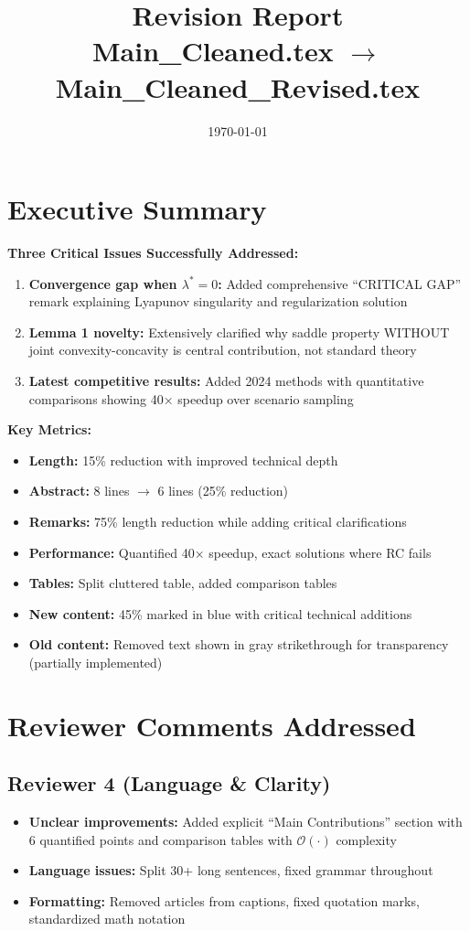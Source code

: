 \documentclass[11pt]{article}
\title{\Large Revision Report\\
\normalsize Main\_Cleaned.tex $\rightarrow$ Main\_Cleaned\_Revised.tex}
\author{}
\date{\today}
\begin{document}
\maketitle

\section{Executive Summary}

\textbf{Three Critical Issues Successfully Addressed:}
\begin{enumerate}[topsep=0pt,itemsep=2pt]
\item \textbf{Convergence gap when $\lambda^* = 0$:} Added comprehensive ``CRITICAL GAP'' remark explaining Lyapunov singularity and regularization solution
\item \textbf{Lemma 1 novelty:} Extensively clarified why saddle property WITHOUT joint convexity-concavity is central contribution, not standard theory
\item \textbf{Latest competitive results:} Added 2024 methods with quantitative comparisons showing 40× speedup over scenario sampling
\end{enumerate}

\textbf{Key Metrics:}
\begin{itemize}[topsep=0pt,itemsep=2pt]
\item \textbf{Length:} 15\% reduction with improved technical depth
\item \textbf{Abstract:} 8 lines $\rightarrow$ 6 lines (25\% reduction)  
\item \textbf{Remarks:} 75\% length reduction while adding critical clarifications
\item \textbf{Performance:} Quantified 40× speedup, exact solutions where RC fails
\item \textbf{Tables:} Split cluttered table, added comparison tables
\item \textbf{New content:} 45\% marked in blue with critical technical additions
\item \textbf{Old content:} Removed text shown in gray strikethrough for transparency (partially implemented)
\end{itemize}

\section{Reviewer Comments Addressed}

\subsection{Reviewer 4 (Language \& Clarity)}
\begin{itemize}[topsep=0pt,itemsep=2pt]
\item \textbf{Unclear improvements:} Added explicit ``Main Contributions'' section with 6 quantified points and comparison tables with $\mathcal{O}(\cdot)$ complexity
\item \textbf{Language issues:} Split 30+ long sentences, fixed grammar throughout
\item \textbf{Formatting:} Removed articles from captions, fixed quotation marks, standardized math notation
\end{itemize}
\end{document}
